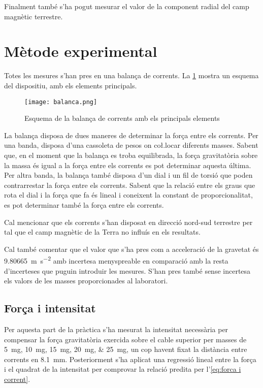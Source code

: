 Finalment també s'ha pogut mesurar el valor de la component radial del camp magnètic terrestre. 

\section{Mètode experimental}
Totes les mesures s'han pres en una balança de corrents. La \cref{fig:balanca} mostra un esquema del dispositiu, amb els elements principals.
\begin{figure}
	\centering
	\texttt{[image: balanca.png]}
	\caption{Esquema de la balança de corrents amb els principals elements}
	\label{fig:balanca}
\end{figure}

La balança disposa de dues maneres de determinar la força entre els corrents. Per una banda, disposa d'una cassoleta de pesos on co\l.locar diferents masses. Sabent que, en el moment que la balança es troba equilibrada, la força gravitatòria sobre la massa és igual a la força entre els corrents es pot determinar aquesta última. Per altra banda, la balança també disposa d'un dial i un fil de torsió que poden contrarrestar la força entre els corrents. Sabent que la relació entre els graus que rota el dial i la força que fa és lineal i coneixent la constant de proporcionalitat, es pot determinar també la força entre els corrents.

Cal mencionar que els corrents s'han disposat en direcció nord-sud terrestre per tal que el camp magnètic de la Terra no influís en els resultats.

Cal també comentar que el valor que s'ha pres com a acceleració de la gravetat és \SI{9.80665}{m.s^{-2}} amb incertesa menyspreable en comparació amb la resta d'incerteses que puguin introduir les mesures. S'han pres també sense incertesa els valors de les masses proporcionades al laboratori.

\subsection{Força i intensitat}
Per aquesta part de la pràctica s'ha mesurat la intensitat necessària per compensar la força gravitatòria exercida sobre el cable superior per masses de \SIlist{5; 10; 15; 20; 25}{mg}, un cop havent fixat la distància entre corrents en \SI{8.1}{mm}. Posteriorment s'ha aplicat una regressió lineal entre la força i el quadrat de la intensitat per comprovar la relació predita per l'\cref{eq:forca i corrent}.


